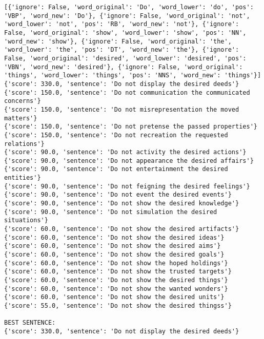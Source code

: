\documentclass[12pt,a4paper,oneside]{book}
\begin{document}
\begin{verbatim}
[{'ignore': False, 'word_original': 'Do', 'word_lower': 'do', 'pos': 'VBP', 'word_new': 'Do'}, {'ignore': False, 'word_original': 'not', 'word_lower': 'not', 'pos': 'RB', 'word_new': 'not'}, {'ignore': False, 'word_original': 'show', 'word_lower': 'show', 'pos': 'NN', 'word_new': 'show'}, {'ignore': False, 'word_original': 'the', 'word_lower': 'the', 'pos': 'DT', 'word_new': 'the'}, {'ignore': False, 'word_original': 'desired', 'word_lower': 'desired', 'pos': 'VBN', 'word_new': 'desired'}, {'ignore': False, 'word_original': 'things', 'word_lower': 'things', 'pos': 'NNS', 'word_new': 'things'}]
{'score': 330.0, 'sentence': 'Do not display the desired deeds'}
{'score': 150.0, 'sentence': 'Do not communication the communicated concerns'}
{'score': 150.0, 'sentence': 'Do not misrepresentation the moved matters'}
{'score': 150.0, 'sentence': 'Do not pretense the passed properties'}
{'score': 150.0, 'sentence': 'Do not recreation the requested relations'}
{'score': 90.0, 'sentence': 'Do not activity the desired actions'}
{'score': 90.0, 'sentence': 'Do not appearance the desired affairs'}
{'score': 90.0, 'sentence': 'Do not entertainment the desired entities'}
{'score': 90.0, 'sentence': 'Do not feigning the desired feelings'}
{'score': 90.0, 'sentence': 'Do not event the desired events'}
{'score': 90.0, 'sentence': 'Do not show the desired knowledge'}
{'score': 90.0, 'sentence': 'Do not simulation the desired situations'}
{'score': 60.0, 'sentence': 'Do not show the desired artifacts'}
{'score': 60.0, 'sentence': 'Do not show the desired ideas'}
{'score': 60.0, 'sentence': 'Do not show the desired aims'}
{'score': 60.0, 'sentence': 'Do not show the desired goals'}
{'score': 60.0, 'sentence': 'Do not show the hoped holdings'}
{'score': 60.0, 'sentence': 'Do not show the trusted targets'}
{'score': 60.0, 'sentence': 'Do not show the desired things'}
{'score': 60.0, 'sentence': 'Do not show the wanted wonders'}
{'score': 60.0, 'sentence': 'Do not show the desired units'}
{'score': 55.0, 'sentence': 'Do not show the desired thingss'}

BEST SENTENCE:
{'score': 330.0, 'sentence': 'Do not display the desired deeds'}



\end{verbatim}
\end{document}
